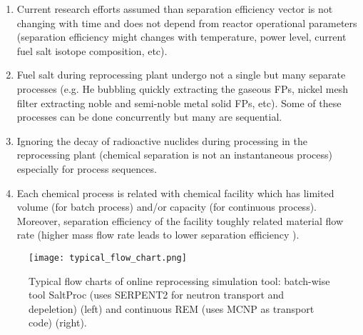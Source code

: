 \begin{enumerate}
	\item Current research efforts assumed than separation 
efficiency vector is not changing with time and does not depend from reactor 
operational parameters (separation efficiency might changes with temperature, 
power level, current fuel salt isotope composition, etc).
	\item Fuel salt during reprocessing plant undergo not a single but many 
	separate processes 
	(e.g. He bubbling quickly extracting the gaseous \glspl{FP}, nickel mesh filter 
	extracting noble  and  semi-noble  metal  solid  \glspl{FP}, etc). Some of 
	these processes can be done concurrently but many are sequential.
	\item Ignoring the decay of radioactive nuclides during processing in  
	the reprocessing plant (chemical separation is not an instantaneous process) 
	especially for process sequences. 
	\item Each chemical process is related with chemical facility which has 
	limited volume (for batch process) and/or capacity (for continuous process). 
	Moreover, separation efficiency of the facility toughly related material flow 
	rate (higher mass flow rate leads to lower separation efficiency \cite{briggs_molten-salt_1969}).
\end{enumerate}

\begin{figure}[hbp!] %
  \texttt{[image: typical\_flow\_chart.png]}
  \caption{Typical flow charts of online reprocessing simulation tool:
  batch-wise tool SaltProc (uses SERPENT2 for neutron transport and 
  depeletion) \cite{rykhlevskii_modeling_2019}
   (left) and continuous  REM (uses MCNP as transport code) 
   \cite{heuer_simulation_2010} (right).} 
  \label{fig:typical_flow_chart}
\end{figure}

